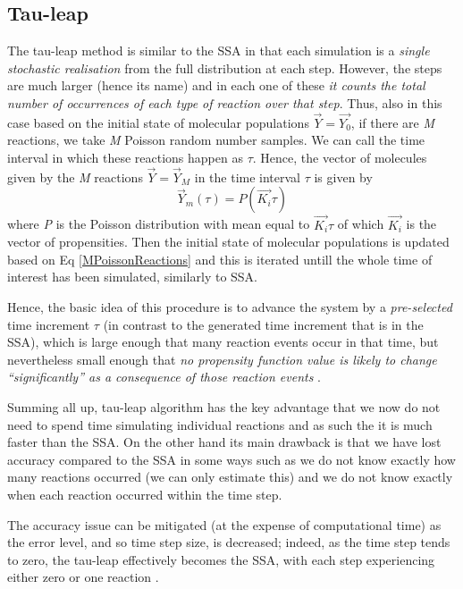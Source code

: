 \documentclass[12pt,a4paper]{report}
\begin{document}
\subsection{Tau-leap}
The tau-leap method is similar to the SSA in that each simulation is a \emph{single stochastic realisation} from the full distribution at each step. However, the steps are much larger (hence its name) \cite{Article} and in each one of these \emph{it counts the total number of occurrences of each type of reaction over that step}. Thus, also in this case based on the initial state of molecular populations $\Vec{Y}=\Vec{Y_{0}}$, if there are \emph{M} reactions, we take \emph{M} Poisson random number samples. We can call the time interval in which these reactions happen as $\tau$. Hence, the vector of molecules given by the \emph{M} reactions $\Vec{Y}=\Vec{Y}_{M}$ in the time interval $\tau$ is given by
\begin{equation}\label{MPoissonReactions}
    \Vec{Y}_{m}(\tau) = P(\Vec{K_{i}}\tau)
\end{equation}
where \emph{P} is the Poisson distribution with mean equal to $\Vec{K_{i}}\tau$ of which $\Vec{K_{i}}$ is the vector of propensities. Then the initial state of molecular populations is updated based on Eq \ref{MPoissonReactions}  and this is iterated untill the whole time of interest has been simulated, similarly to SSA.


Hence, the basic idea of this procedure is to advance the system by a \emph{pre-selected} time increment $\tau$ (in contrast to the generated time increment that is in the SSA), which is large enough that many reaction events occur in that time, but nevertheless small enough that \emph{no propensity function value is likely to change ``significantly'' as a consequence of those reaction events} \cite{Method}.


Summing all up, tau-leap algorithm has the key advantage that we now do not need to spend time simulating individual reactions and as such the it is much faster than the SSA. On the other hand its main drawback is that we have lost accuracy compared to the SSA in some ways such as we do not know exactly how many reactions occurred (we can only estimate this) and we do not know exactly when each reaction occurred within the time step.


The accuracy issue can be mitigated (at the expense of computational time) as the error level, and so time step size, is decreased; indeed, as the time step tends to zero, the tau-leap effectively becomes the SSA, with each step experiencing either zero or one reaction \cite{Article}. 
\end{document}
